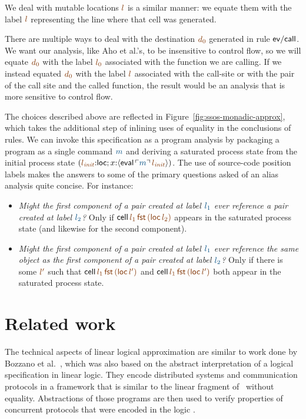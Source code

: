 We deal with mutable locations $\lf{l}$ is a similar manner: we equate them
with the label $\lf{l}$ representing the line where that cell was
generated.

There are multiple ways to deal with the destination $\lf{d_0}$ generated
in rule ${\sf ev/call}$. We want our analysis, like Aho et al.'s, to
be insensitive to control flow, so we will equate $\lf{d_0}$ with the label
$\lf{l_0}$ associated with the function we are calling.  If we instead
equated $\lf{d_0}$ with the label $\lf{l}$ associated with the call-site or with
the pair of the call site and the called function, the result would be
an analysis that is more sensitive to control flow.

The choices described above are reflected in
Figure~\ref{fig:ssos-monadic-approx}, which takes the additional step
of inlining uses of equality in the conclusions of rules. We can
invoke this specification as a program analysis by packaging a program
as a single command $\obj{m}$ and deriving a saturated process state from the
initial process state $(\lf{l_{\it init}}{:}{\sf loc}; x{:}\susp{{\sf
    eval}\,\interp{m}\,\lf{l_{\it init}}})$. 
The use of source-code position labels
makes the answers to some of the primary questions asked of an alias
analysis quite concise. For instance:

\smallskip
\begin{itemize}
\item {\it Might the first component of a pair created at label
    $\obj{l_1}$ ever reference a pair created at label $\obj{l_2}$?}
  Only if ${\sf cell}\,\lf{l_1}\,\lf{\sf fst}\,\lf{({\sf loc}\,l_2)}$
  appears in the saturated process state (and likewise for the second
  component).
\item {\it Might the first component of a pair created at label
    $\obj{l_1}$ ever reference the same object as the first component
    of a pair created at label $\obj{l_2}$?} Only if there is some
  $\lf{l'}$ such that ${\sf cell}\,\lf{l_1}\,\lf{\sf fst}\,\lf{({\sf
      loc}\,l')}$ and ${\sf cell}\,\lf{l_1}\,\lf{\sf fst}\,\lf{({\sf
      loc}\,l')}$ both appear in the saturated process state.
\end{itemize}

\section{Related work}
\label{sec:approximately-related}

The technical aspects of linear logical approximation are similar to
work done by Bozzano et al.~\cite{bozzano02effective,bozzano04model},
which was also based on the abstract interpretation of a logical
specification in linear logic.
They encode distributed systems and communication protocols in
a framework that is similar to the linear fragment of \sls~without
equality. Abstractions of those programs are then used to verify
properties of concurrent protocols that were encoded in the logic
\cite{bozzano02protocol}. 

